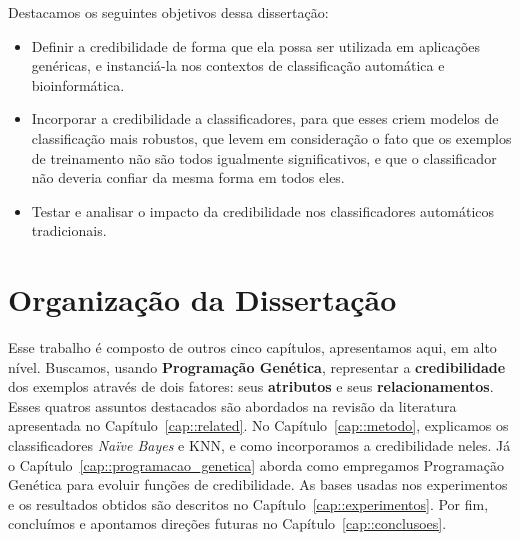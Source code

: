 Destacamos os seguintes objetivos dessa dissertação:

\begin{itemize}
 
\item Definir a credibilidade de forma que ela possa ser utilizada em aplicações genéricas, e instanciá-la nos contextos de classificação automática e bioinformática.
\item Incorporar a credibilidade a classificadores, para que esses criem modelos de classificação mais robustos, que levem em consideração o fato que os exemplos de treinamento não são todos igualmente significativos, e que o classificador não deveria confiar da mesma forma em todos eles. 
\item Testar e analisar o impacto da credibilidade nos classificadores automáticos tradicionais.

\end{itemize}

\section{Organização da Dissertação}

Esse trabalho é composto de outros cinco capítulos, apresentamos aqui, em alto nível.
Buscamos, usando \textbf{Programação Genética}, representar a \textbf{credibilidade} dos exemplos através de dois fatores: seus \textbf{atributos} e seus \textbf{relacionamentos}.
Esses quatros assuntos destacados são abordados na revisão da literatura apresentada no Capítulo~\ref{cap::related}.
No Capítulo~\ref{cap::metodo}, explicamos os classificadores \textit{Naïve Bayes} e \textsc{KNN}, e como incorporamos a credibilidade neles.
Já o Capítulo~\ref{cap::programacao_genetica} aborda como empregamos Programação Genética para evoluir funções de credibilidade.
As bases usadas nos experimentos e os resultados obtidos são descritos no Capítulo~\ref{cap::experimentos}. Por fim, concluímos e apontamos direções futuras no Capítulo~\ref{cap::conclusoes}.


